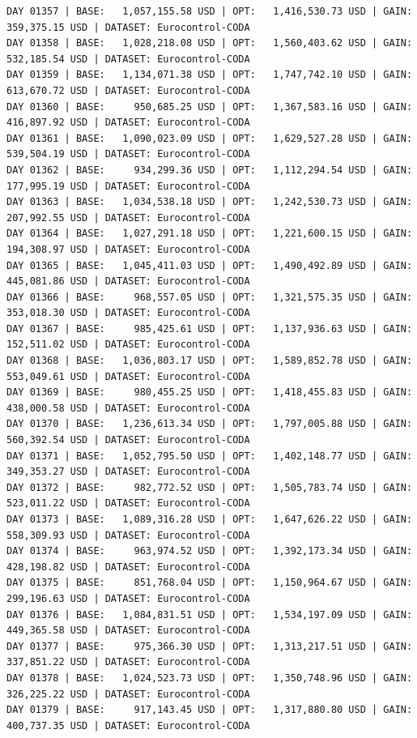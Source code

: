 \documentclass[11pt,a4paper]{article}
\begin{document}
\begin{verbatim}
DAY 01357 | BASE:   1,057,155.58 USD | OPT:   1,416,530.73 USD | GAIN: 359,375.15 USD | DATASET: Eurocontrol-CODA
DAY 01358 | BASE:   1,028,218.08 USD | OPT:   1,560,403.62 USD | GAIN: 532,185.54 USD | DATASET: Eurocontrol-CODA
DAY 01359 | BASE:   1,134,071.38 USD | OPT:   1,747,742.10 USD | GAIN: 613,670.72 USD | DATASET: Eurocontrol-CODA
DAY 01360 | BASE:     950,685.25 USD | OPT:   1,367,583.16 USD | GAIN: 416,897.92 USD | DATASET: Eurocontrol-CODA
DAY 01361 | BASE:   1,090,023.09 USD | OPT:   1,629,527.28 USD | GAIN: 539,504.19 USD | DATASET: Eurocontrol-CODA
DAY 01362 | BASE:     934,299.36 USD | OPT:   1,112,294.54 USD | GAIN: 177,995.19 USD | DATASET: Eurocontrol-CODA
DAY 01363 | BASE:   1,034,538.18 USD | OPT:   1,242,530.73 USD | GAIN: 207,992.55 USD | DATASET: Eurocontrol-CODA
DAY 01364 | BASE:   1,027,291.18 USD | OPT:   1,221,600.15 USD | GAIN: 194,308.97 USD | DATASET: Eurocontrol-CODA
DAY 01365 | BASE:   1,045,411.03 USD | OPT:   1,490,492.89 USD | GAIN: 445,081.86 USD | DATASET: Eurocontrol-CODA
DAY 01366 | BASE:     968,557.05 USD | OPT:   1,321,575.35 USD | GAIN: 353,018.30 USD | DATASET: Eurocontrol-CODA
DAY 01367 | BASE:     985,425.61 USD | OPT:   1,137,936.63 USD | GAIN: 152,511.02 USD | DATASET: Eurocontrol-CODA
DAY 01368 | BASE:   1,036,803.17 USD | OPT:   1,589,852.78 USD | GAIN: 553,049.61 USD | DATASET: Eurocontrol-CODA
DAY 01369 | BASE:     980,455.25 USD | OPT:   1,418,455.83 USD | GAIN: 438,000.58 USD | DATASET: Eurocontrol-CODA
DAY 01370 | BASE:   1,236,613.34 USD | OPT:   1,797,005.88 USD | GAIN: 560,392.54 USD | DATASET: Eurocontrol-CODA
DAY 01371 | BASE:   1,052,795.50 USD | OPT:   1,402,148.77 USD | GAIN: 349,353.27 USD | DATASET: Eurocontrol-CODA
DAY 01372 | BASE:     982,772.52 USD | OPT:   1,505,783.74 USD | GAIN: 523,011.22 USD | DATASET: Eurocontrol-CODA
DAY 01373 | BASE:   1,089,316.28 USD | OPT:   1,647,626.22 USD | GAIN: 558,309.93 USD | DATASET: Eurocontrol-CODA
DAY 01374 | BASE:     963,974.52 USD | OPT:   1,392,173.34 USD | GAIN: 428,198.82 USD | DATASET: Eurocontrol-CODA
DAY 01375 | BASE:     851,768.04 USD | OPT:   1,150,964.67 USD | GAIN: 299,196.63 USD | DATASET: Eurocontrol-CODA
DAY 01376 | BASE:   1,084,831.51 USD | OPT:   1,534,197.09 USD | GAIN: 449,365.58 USD | DATASET: Eurocontrol-CODA
DAY 01377 | BASE:     975,366.30 USD | OPT:   1,313,217.51 USD | GAIN: 337,851.22 USD | DATASET: Eurocontrol-CODA
DAY 01378 | BASE:   1,024,523.73 USD | OPT:   1,350,748.96 USD | GAIN: 326,225.22 USD | DATASET: Eurocontrol-CODA
DAY 01379 | BASE:     917,143.45 USD | OPT:   1,317,880.80 USD | GAIN: 400,737.35 USD | DATASET: Eurocontrol-CODA

\end{verbatim}
\end{document}
